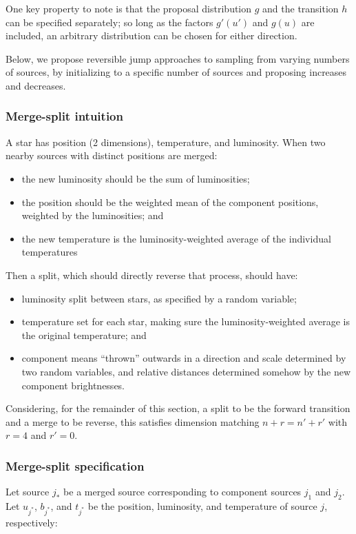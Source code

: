 \documentclass[11pt]{article}
\begin{document}
One key property to note is that the proposal distribution $g$ and
the transition $h$ can be specified separately; so long as the factors
$g'\left(u'\right)$ and $g\left(u\right)$ are included, an arbitrary
distribution can be chosen for either direction.

Below, we propose reversible jump approaches to sampling from varying
numbers of sources, by initializing to a specific number of sources
and proposing increases and decreases.


\subsubsection{Merge-split intuition}

A star has position (2 dimensions), temperature, and luminosity.
When two nearby sources with distinct positions are merged:
\begin{itemize}
\item the new luminosity should be the sum of luminosities;
\item the position should be the weighted mean of the component positions,
weighted by the luminosities; and
\item the new temperature is the luminosity-weighted average of the
individual temperatures
\end{itemize}
Then a split, which should directly reverse that process, should have:
\begin{itemize}
\item luminosity split between stars, as specified by a random variable;
\item temperature set for each star, making sure the luminosity-weighted average
is the original temperature; and
\item component means {}``thrown'' outwards in a direction and scale determined
by two random variables, and relative distances determined somehow
by the new component brightnesses.
\end{itemize}
Considering, for the remainder of this section, a split to be the
forward transition and a merge to be reverse, this satisfies dimension
matching $n+r=n'+r'$ with $r=4$ and $r'=0$.


\subsubsection{Merge-split specification\label{sub:merge-split-specification}}

Let source $j_{*}$ be a merged source corresponding to component
sources $j_{1}$ and $j_{2}$. Let $u_{j^*}$, $b_{j^*}$, and $t_{j^*}$
be the position, luminosity, and temperature of source $j$,
respectively:
\end{document}
